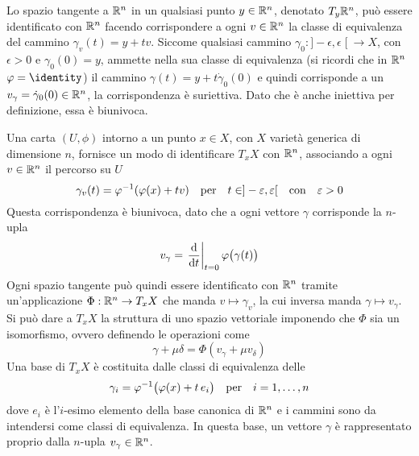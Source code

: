 Lo spazio tangente a $\mathbb{R}^{n}$ in un qualsiasi punto $y \in \mathbb{R}^{n}$, denotato $T_y \mathbb{R}^{n}$, può essere identificato con $\mathbb{R}^{n}$ facendo corrispondere a ogni $v \in \mathbb{R}^{n}$ la classe di equivalenza del cammino $\gamma_v(t) = y + tv$. Siccome qualsiasi cammino $\gamma_0:]-\epsilon,\epsilon\;[\ \to X$, con $\epsilon > 0$ e $\gamma_0(0)=y$, ammette nella sua classe di equivalenza (si ricordi che in $\mathbb{R}^{n}$ $\phi = \identity$) il cammino $\gamma(t) = y + t\dot{\gamma}_0(0)$ e quindi corrisponde a un $v_{\gamma} = \dot{\gamma}_0(0) \in \mathbb{R}^{n}$, la corrispondenza è suriettiva. Dato che è anche iniettiva per definizione, essa è biunivoca. 

Una carta $(U, \phi)$ intorno a un punto $x \in  X$, con $X$ varietà generica di dimensione $n$, fornisce un modo di identificare $T_x X$ con $\mathbb{R}^{n}$, associando a ogni $v \in \mathbb{R}^{n}$ il percorso su $U$ \begin{equation} \label{eq:tangentRn}
  \gamma_{v}(t) = \phi^{-1}(\phi(x)+tv) \qqtext{per} t \in ]-\epsilon, \epsilon[ \qqtext{con} \epsilon > 0
\end{equation} Questa corrispondenza è biunivoca, dato che a ogni vettore $\gamma$ corrisponde la $n$-upla \begin{equation*} \label{eq:tangentCoords}
v_{\gamma} = \eval{\dv{t}}_{t=0} \phi\big( \gamma(t)\big)
\end{equation*} Ogni spazio tangente può quindi essere identificato con $\mathbb{R}^{n}$ tramite un'applicazione $\Phi: \mathbb{R}^{n} \to T_x X$ che manda $v \mapsto \gamma_v$, la cui inversa manda $\gamma \mapsto v_{\gamma}$. Si può dare a $T_x X$ la struttura di uno spazio vettoriale imponendo che $\Phi$ sia un isomorfismo, ovvero definendo le operazioni come
\begin{equation*}
\gamma + \mu \delta = \Phi(v_\gamma + \mu v_{\delta})
\end{equation*}
Una base di $T_x X$ è costituita dalle classi di equivalenza delle  \begin{equation} \label{eq:tangentRnBase}
  \gamma_i = \phi^{-1}\big(\phi(x)+t\, e_i\big) \qqtext{per} i=1, \ldots, n
\end{equation}
dove $e_i$ è l'$i$-esimo elemento della base canonica di $\mathbb{R}^{n}$ e i cammini sono da intendersi come classi di equivalenza. In questa base, un vettore $\gamma$ è rappresentato proprio dalla $n$-upla $v_{\gamma} \in \mathbb{R}^{n}$.

